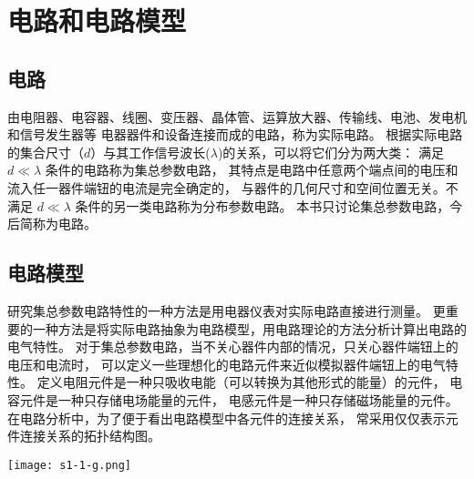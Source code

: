\section{电路和电路模型}

\subsection{电路}
由电阻器、电容器、线圈、变压器、晶体管、运算放大器、传输线、电池、发电机和信号发生器等
电器器件和设备连接而成的电路，称为实际电路。
根据实际电路的集合尺寸（$d$）与其工作信号波长($\lambda$)的关系，可以将它们分为两大类：
满足 $d\ll\lambda$ 条件的电路称为集总参数电路，
其特点是电路中任意两个端点间的电压和流入任一器件端钮的电流是完全确定的，
与器件的几何尺寸和空间位置无关。不满足 $d\ll\lambda$ 条件的另一类电路称为分布参数电路。
本书只讨论集总参数电路，今后简称为电路。

\subsection{电路模型}
研究集总参数电路特性的一种方法是用电器仪表对实际电路直接进行测量。
更重要的一种方法是将实际电路抽象为电路模型，用电路理论的方法分析计算出电路的电气特性。
对于集总参数电路，当不关心器件内部的情况，只关心器件端钮上的电压和电流时，
可以定义一些理想化的电路元件来近似模拟器件端钮上的电气特性。
定义电阻元件是一种只吸收电能（可以转换为其他形式的能量）的元件，
电容元件是一种只存储电场能量的元件，
电感元件是一种只存储磁场能量的元件。
在电路分析中，为了便于看出电路模型中各元件的连接关系，
常采用仅仅表示元件连接关系的拓扑结构图。

\texttt{[image: s1-1-g.png]}
